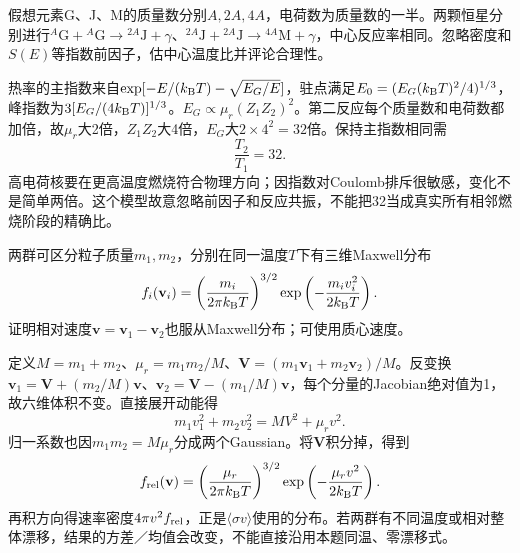 \begin{exercise}
假想元素G、J、M的质量数分别$A,2A,4A$，电荷数为质量数的一半。两颗恒星分别进行$^A\mathrm G+{}^A\mathrm G\to{}^{2A}\mathrm J+\gamma$、$^{2A}\mathrm J+{}^{2A}\mathrm J\to{}^{4A}\mathrm M+\gamma$，中心反应率相同。忽略密度和$S(E)$等指数前因子，估中心温度比并评论合理性。
\end{exercise}
\begin{solution}
热率的主指数来自$\exp[-E/(k_{\mathrm B} T)-\sqrt{E_G/E}]$，驻点满足$E_0=(E_G(k_{\mathrm B} T)^2/4)^{1/3}$，峰指数为$3[E_G/(4k_{\mathrm B} T)]^{1/3}$。$E_G\propto\mu_r(Z_1Z_2)^2$。第二反应每个质量数和电荷数都加倍，故$\mu_r$大2倍，$Z_1Z_2$大4倍，$E_G$大$2\times4^2=32$倍。保持主指数相同需
\[
 \frac{T_2}{T_1}=32.
\]
高电荷核要在更高温度燃烧符合物理方向；因指数对Coulomb排斥很敏感，变化不是简单两倍。这个模型故意忽略前因子和反应共振，不能把32当成真实所有相邻燃烧阶段的精确比。
\end{solution}

\begin{exercise}
两群可区分粒子质量$m_1,m_2$，分别在同一温度$T$下有三维Maxwell分布
\[
 f_i(\mathbf v_i)=\left(\frac{m_i}{2\pi k_{\mathrm B} T}\right)^{3/2}
 \exp\left(-\frac{m_iv_i^2}{2k_{\mathrm B} T}\right).
\]
证明相对速度$\mathbf v=\mathbf v_1-\mathbf v_2$也服从Maxwell分布；可使用质心速度。
\end{exercise}
\begin{solution}
定义$M=m_1+m_2$、$\mu_r=m_1m_2/M$、$\mathbf V=(m_1\mathbf v_1+m_2\mathbf v_2)/M$。反变换$\mathbf v_1=\mathbf V+(m_2/M)\mathbf v$、$\mathbf v_2=\mathbf V-(m_1/M)\mathbf v$，每个分量的Jacobian绝对值为1，故六维体积不变。直接展开动能得
\[
 m_1v_1^2+m_2v_2^2=MV^2+\mu_rv^2.
\]
归一系数也因$m_1m_2=M\mu_r$分成两个Gaussian。将$\mathbf V$积分掉，得到
\[
 f_{\rm rel}(\mathbf v)=
 \left(\frac{\mu_r}{2\pi k_{\mathrm B} T}\right)^{3/2}
 \exp\left(-\frac{\mu_rv^2}{2k_{\mathrm B} T}\right).
\]
再积方向得速率密度$4\pi v^2f_{\rm rel}$，正是$\langle\sigma v\rangle$使用的分布。若两群有不同温度或相对整体漂移，结果的方差／均值会改变，不能直接沿用本题同温、零漂移式。
\end{solution}
